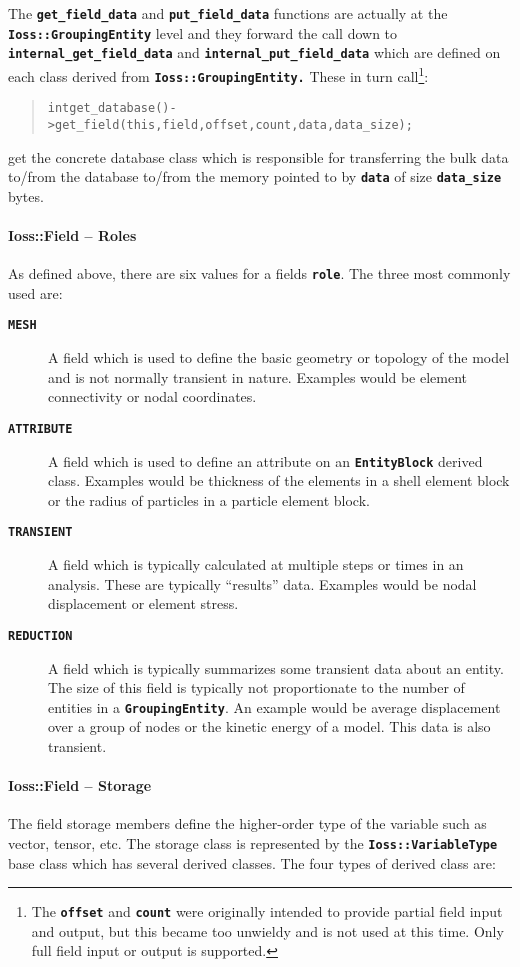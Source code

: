 \documentclass[11pt,twoside]{article}
\newcommand{\code}[1]
   {\mbox{\bf\tt #1}\null}
\newenvironment{source}
{\small\begin{quote}\begin{alltt}}
{\end{alltt}\end{quote}\normalsize}
\begin{document}
The \code{get\_field\_data} and
\code{put\_field\_data} functions are actually at
the\code{ Ioss::GroupingEntity} level and they forward the
call down to \code{internal\_get\_field\_data} and
\code{internal\_put\_field\_data} which are defined on each
class derived from \code{Ioss::GroupingEntity.} These in turn
call\footnote{The \code{offset} and \code{count}
were originally intended to provide partial field input and output, but
this became too unwieldy and is not used at this time. Only full field
input or output is supported.}:
\begin{source}
int get\_database(){}-{\textgreater}get\_field(this, field, offset, count, data, data\_size);
\end{source}

get the concrete database class which is responsible for transferring
the bulk data to/from the database to/from the memory pointed to by
\code{data} of size \code{data\_size} bytes.

\paragraph{Ioss::Field -- Roles}
As defined above, there are six values for a fields
\code{role}. The three most commonly used are:

\begin{description}
\item [\code{MESH}] A field which is used to define the basic
geometry or topology of the model and is not normally transient in
nature. Examples would be element connectivity or nodal coordinates.
\item [\code{ATTRIBUTE}] A field which is used to define an attribute
on an \code{EntityBlock} derived class.  Examples would be thickness
of the elements in a shell element block or the radius of particles in
a particle element block.
\item [\code{TRANSIENT}] A field which is typically calculated
at multiple steps or times in an analysis. These are typically
``results'' data. Examples would be nodal displacement or element
stress.
\item [\code{REDUCTION}] A field which is typically summarizes
some transient data about an entity. The size of this field is
typically not proportionate to the number of entities in a
\code{GroupingEntity}. An example would be average
displacement over a group of nodes or the kinetic energy of a model.
This data is also transient.
\end{description}
\paragraph{Ioss::Field -- Storage}
The field storage members define the higher{}-order type of the variable
such as vector, tensor, etc. The storage class is represented by the
\code{Ioss::VariableType} base class which has several
derived classes. The four types of derived class are:
\end{document}
